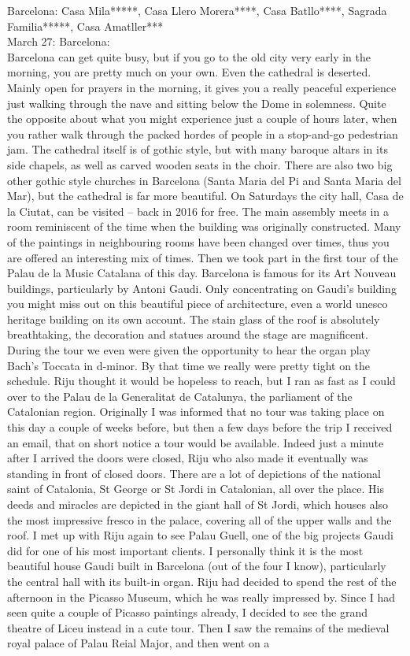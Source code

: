 Barcelona: Casa Mila*****, Casa Llero Morera****, Casa Batllo****, Sagrada Familia*****, Casa Amatller***\\

March 27: Barcelona:\\
Barcelona can get quite busy, but if you go to the old city very early in the morning, you are pretty much on your own. Even the cathedral is deserted. Mainly open for prayers in the morning, it gives you a really peaceful experience just walking through the nave and sitting below the Dome in solemness. Quite the opposite about what you might experience just a couple of hours later, when you rather walk through the packed hordes of people in a stop-and-go pedestrian jam. The cathedral itself is of gothic style, but with many baroque altars in its side chapels, as well as carved wooden seats in the choir. There are also two big other gothic style churches in Barcelona (Santa Maria del Pi and Santa Maria del Mar), but the cathedral is far more beautiful. On Saturdays the city hall, Casa de la Ciutat, can be visited -- back in 2016 for free. The main assembly meets in a room reminiscent of the time when the building was originally constructed. Many of the paintings in neighbouring rooms have been changed over times, thus you are offered an interesting mix of times. Then we took part in the first tour of the Palau de la Music Catalana of this day. Barcelona is famous for its Art Nouveau buildings, particularly by Antoni Gaudi. Only concentrating on Gaudi's building you might miss out on this beautiful piece of architecture, even a world unesco heritage building on its own account. The stain glass of the roof is absolutely breathtaking, the decoration and statues around the stage are magnificent. During the tour we even were given the opportunity to hear the organ play Bach's Toccata in d-minor. By that time we really were pretty tight on the schedule. Riju thought it would be hopeless to reach, but I ran as fast as I could over to the Palau de la Generalitat de Catalunya, the parliament of the Catalonian region. Originally I was informed that no tour was taking place on this day a couple of weeks before, but then a few days before the trip I received an email, that on short notice a tour would be available. Indeed just a minute after I arrived the doors were closed, Riju who also made it eventually was standing in front of closed doors. There are a lot of depictions of the national saint of Catalonia, St George or St Jordi in Catalonian, all over the place. His deeds and miracles are depicted in the giant hall of St Jordi, which houses also the most impressive fresco in the palace, covering all of the upper walls and the roof. I met up with Riju again to see Palau Guell, one of the big projects Gaudi did for one of his most important clients. I personally think it is the most beautiful house Gaudi built in Barcelona (out of the four I know), particularly the central hall with its built-in organ. Riju had decided to spend the rest of the afternoon in the Picasso Museum, which he was really impressed by. Since I had seen quite a couple of Picasso paintings already, I decided to see the grand theatre of Liceu instead in a cute tour. Then I saw the remains of the medieval royal palace of Palau Reial Major, and then went on a 
